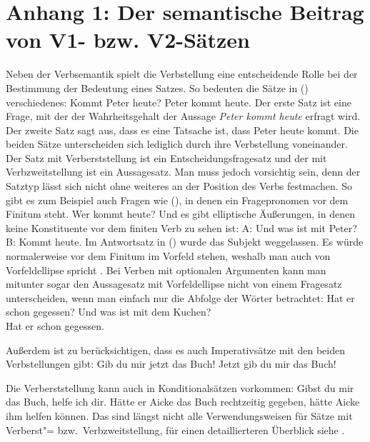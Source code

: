 \section{Anhang 1: Der semantische Beitrag von V1- bzw. V2-Sätzen}
\label{sec-semantik-v1-v2}

%

Neben der Verbsemantik spielt die Verbstellung eine entscheidende Rolle bei der
Bestimmung der Bedeutung eines Satzes. So bedeuten die Sätze in () verschiedenes:
\eal
\ex Kommt Peter heute? 
\ex Peter kommt heute.
\zl
Der erste Satz ist eine Frage, mit der der Wahrheitsgehalt der Aussage \emph{Peter kommt heute}
erfragt wird. Der zweite Satz sagt aus, dass es eine Tatsache ist, dass Peter heute kommt. Die beiden
Sätze unterscheiden sich lediglich durch ihre Verbstellung voneinander. Der Satz mit Verberststellung
ist ein Entscheidungsfragesatz und der mit Verbzweitstellung ist ein
Aussagesatz. Man muss jedoch vorsichtig sein, denn der Satztyp lässt sich
nicht ohne weiteres an der Position des Verbs festmachen. So gibt es zum Beispiel auch Fragen wie
(), in denen ein Fragepronomen vor dem Finitum steht.
\ea
Wer kommt heute?
\z
Und es gibt elliptische Äußerungen, in denen keine Konstituente vor dem finiten Verb zu sehen ist:
\ea
A: Und was ist mit Peter?\\
B: Kommt heute.
\z
Im Antwortsatz in () wurde das Subjekt weggelassen. Es würde normalerweise vor dem Finitum im Vorfeld
stehen, weshalb man auch von Vorfeldellipse spricht \citep{Fries88b}.
Bei Verben mit optionalen Argumenten kann man mitunter sogar den Aussagesatz mit Vorfeldellipse
nicht von einem Fragesatz unterscheiden, wenn man einfach nur die Abfolge der Wörter betrachtet:
\eal
\label{bsp-hat-er-gegessen}
\ex Hat er schon gegessen?
\ex Und was ist mit dem Kuchen?\\
    Hat er schon gegessen.
\zl

\noindent
Außerdem ist zu berücksichtigen, dass es auch Imperativsätze mit den beiden Verbstellungen gibt:
\eal
\ex Gib du mir jetzt das Buch!
\ex Jetzt gib du mir das Buch!
\zl

\noindent
Die Verberststellung kann auch in Konditionalsätzen vorkommen:
\eal
\ex Gibst du mir das Buch, helfe ich dir.
\ex Hätte er Aicke das Buch rechtzeitig gegeben, hätte Aicke ihm helfen können.
\zl
Das sind längst nicht alle Verwendungsweisen für Sätze mit Verberst"= bzw.\ Verbzweitstellung,
für einen detaillierteren Überblick siehe .

